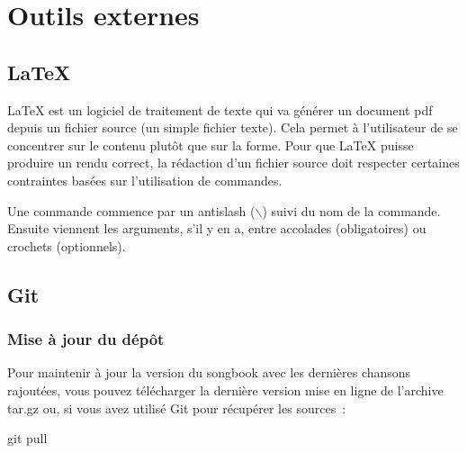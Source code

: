 \chapter{Outils externes}
\setcounter{chapter}{3}
\label{chap:outils-externes}
\minitoc
\newpage

\section{\LaTeX{}}

\LaTeX{} est un logiciel de traitement de texte qui va générer un
document pdf depuis un fichier source (un simple fichier texte). Cela
permet à l'utilisateur de se concentrer sur le contenu plutôt que sur
la forme. Pour que \LaTeX{} puisse produire un rendu correct, la
rédaction d'un fichier source doit respecter certaines contraintes
basées sur l'utilisation de commandes.

Une commande commence par un antislash ($\backslash$) suivi du nom de
la commande. Ensuite viennent les arguments, s'il y en a, entre
accolades (obligatoires) ou crochets (optionnels).


\section{Git}

\subsection{Mise à jour du dépôt}

Pour maintenir à jour la version du songbook avec les dernières
chansons rajoutées, vous pouvez télécharger la dernière version mise
en ligne de l'archive tar.gz ou, si vous avez utilisé Git pour
récupérer les sources~:
\begin{unix}
  git pull
\end{unix} 

